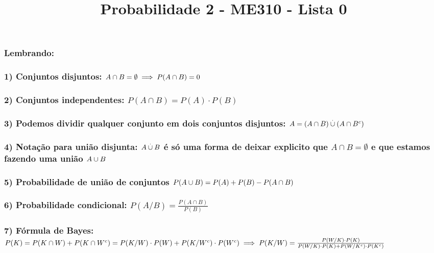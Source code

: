 \documentclass[portuguese]{article}
\begin{document}
\title{Probabilidade 2 - ME310 - Lista 0}

\maketitle

\subsubsection*{Lembrando:}


\subsubsection*{1) Conjuntos disjuntos: $A\cap B=\emptyset\protect\implies P(A\cap B)=0$}


\subsubsection*{2) Conjuntos independentes: $P(A\cap B)=P(A)\cdot P(B)$}


\subsubsection*{3) Podemos dividir qualquer conjunto em dois conjuntos disjuntos:
$A=(A\cap B)\protect\overset{.}{\cup}(A\cap B^{c})$}


\subsubsection*{4) Notação para união disjunta: $A\protect\overset{.}{\cup}B$ é
só uma forma de deixar explicito que $A\cap B=\emptyset$ e que estamos
fazendo uma união $A\protect\overset{}{\cup}B$ }


\subsubsection*{5) Probabilidade de união de conjuntos $P(A\cup B)\protect\overset{}{=}P(A)+P(B)-P(A\cap B)$}


\subsubsection*{6) Probabilidade condicional: $P(A/B)=\frac{P(A\cap B)}{P(B)}$}


\subsubsection*{7) Fórmula de Bayes: $P(K)=P(K\cap W)+P(K\cap W^{c})=P(K/W)\cdot P(W)+P(K/W^{c})\cdot P(W^{c})\protect\implies P(K/W)=\frac{P(W/K)\cdot P(K)}{P(W/K)\cdot P(K)+P(W/K^{c})\cdot P(K^{c})}$}
\end{document}
